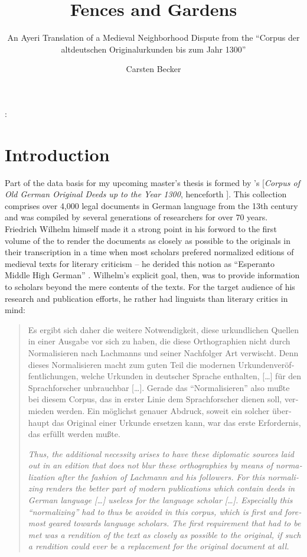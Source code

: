 \documentclass[12pt,paper=a4]{scrartcl}
\author{Carsten Becker}
\title{Fences and Gardens}
\subtitle{An Ayeri Translation of a Medieval Neighborhood Dispute from the \enquote{Corpus der altdeutschen Originalurkunden bis zum Jahr 1300}}
\newenvironment{mytitle}{
    \hfill
    \begin{minipage}{0.667\textwidth}
	\vspace{\baselineskip}
	\begin{center}
	    \Large
	    \sffamily\bfseries
	    \makeatletter
}{
	    \makeatother
	\end{center}
	\vspace{1em}
    \end{minipage}
    \hfill
}
\begin{document}

\begin{mytitle}
    \@title: \@subtitle
\end{mytitle}

\section{Introduction}
Part of the data basis for my upcoming master's thesis is formed by \citeauthor{CAO}'s  [\emph{Corpus of Old German Original Deeds up to the Year 1300}, henceforth ]. This collection comprises over 4,000 legal documents in German language from the 13th century and was compiled by several generations of researchers for over 70 years. Friedrich Wilhelm himself made it a strong point in his forword to the first volume of the  to render the documents as closely as possible to the originals in their transcription in a time when most scholars prefered normalized editions of medieval texts for literary criticism – he derided this notion as \enquote{Esperanto Middle High German} \autocite[see][VIII--IX]{CAO1}. Wilhelm's explicit goal, then, was to provide information to scholars beyond the mere contents of the texts. For the target audience of his research and publication efforts, he rather had linguists than literary critics in mind:

\foreignblockquote{german}{\begin{multicols}{2}Es ergibt sich daher die weitere Notwendigkeit, diese urkundlichen Quellen in einer Ausgabe vor sich zu haben, die diese Orthographien nicht durch Normalisieren nach Lachmanns und seiner Nachfolger Art verwischt. Denn dieses Normalisieren macht zum guten Teil die modernen Urkundenveröffentlichungen, welche Urkunden in deutscher Sprache enthalten, […] für den Sprachforscher unbrauchbar […]. Gerade das \enquote{Normalisieren} also mußte bei diesem Corpus, das in erster Linie dem Sprachforscher dienen soll, vermieden werden. Ein möglichst genauer Abdruck, soweit ein solcher überhaupt das Original einer Urkunde ersetzen kann, war das erste Erfordernis, das erfüllt werden mußte. \autocite[LX]{CAO1}

\columnbreak

{\itshape Thus, the additional necessity arises to have these diplomatic sources laid out in an edition that does not blur these orthographies by means of normalization after the fashion of Lachmann and his followers. For this normalizing renders the better part of modern publications which contain deeds in German language […] useless for the language scholar […]. Especially this \enquote{normalizing} had to thus be avoided in this corpus, which is first and foremost geared towards language scholars. The first requirement that had to be met was a rendition of the text as closely as possible to the original, if such a rendition could ever be a replacement for the original document at all.}\end{multicols}}
\end{document}
